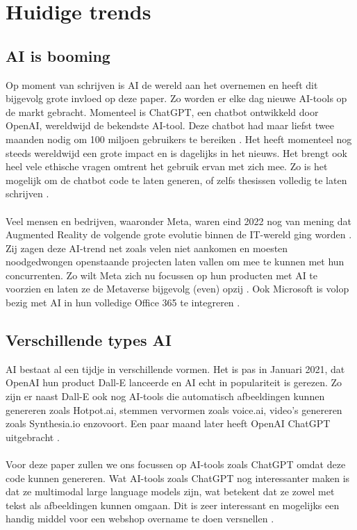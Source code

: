 \section{Huidige trends}
\subsection{AI is booming}
Op moment van schrijven is AI de wereld aan het overnemen en heeft dit bijgevolg grote invloed op deze paper. Zo worden er elke dag nieuwe AI-tools op de markt gebracht. Momenteel is ChatGPT, een chatbot ontwikkeld door OpenAI, wereldwijd de bekendste AI-tool. Deze chatbot had maar liefst twee maanden nodig om 100 miljoen gebruikers te bereiken \autocite{Brownlee2023}. Het heeft momenteel nog steeds wereldwijd een grote impact en is dagelijks in het nieuws. Het brengt ook heel vele ethische vragen omtrent het gebruik ervan met zich mee. Zo is het mogelijk om de chatbot code te laten generen, of zelfs thesissen volledig te laten schrijven \autocite{Dumitrescu2023}.
\\\\
Veel mensen en bedrijven, waaronder Meta, waren eind 2022 nog van mening dat Augmented Reality de volgende grote evolutie binnen de IT-wereld ging worden \autocite{Brownlee2023a}. Zij zagen deze AI-trend net zoals velen niet aankomen en moesten noodgedwongen openstaande projecten laten vallen om mee te kunnen met hun concurrenten. Zo wilt Meta zich nu focussen op hun producten met AI te voorzien en laten ze de Metaverse bijgevolg (even) opzij \autocite{Howley2023}. Ook Microsoft is volop bezig met AI in hun volledige Office 365 te integreren \autocite{Hendrikman2023}. 
\subsection{Verschillende types AI}
AI bestaat al een tijdje in verschillende vormen. Het is pas in Januari 2021, dat OpenAI hun product Dall-E lanceerde en AI echt in populariteit is gerezen. Zo zijn er naast Dall-E ook nog AI-tools die automatisch afbeeldingen kunnen genereren zoals Hotpot.ai, stemmen vervormen zoals voice.ai, video's genereren zoals Synthesia.io enzovoort. Een paar maand later heeft OpenAI ChatGPT uitgebracht \autocite{Bridle2023}.
\\\\
Voor deze paper zullen we ons focussen op AI-tools zoals ChatGPT omdat deze code kunnen genereren. Wat AI-tools zoals ChatGPT nog interessanter maken is dat ze multimodal large language models zijn, wat betekent dat ze zowel met tekst als afbeeldingen kunnen omgaan. Dit is zeer interessant en mogelijks een handig middel voor een webshop overname te doen versnellen \autocite{MelissaHeikkilaea2022}.

